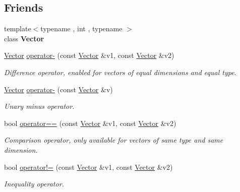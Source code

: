 \subsection*{Friends}
\begin{DoxyCompactItemize}
\item 
\hypertarget{classVector_a4f79607c18aef2105d5ec6b3259ecf32}{}\label{classVector_a4f79607c18aef2105d5ec6b3259ecf32} 
{\footnotesize template$<$typename , int , typename $>$ }\\class {\bfseries Vector}
\item 
\hypertarget{classVector_a885f29c16d9844e1629e3f4c89cf5499}{}\label{classVector_a885f29c16d9844e1629e3f4c89cf5499} 
\hyperlink{classVector}{Vector} \hyperlink{classVector_a885f29c16d9844e1629e3f4c89cf5499}{operator-\/} (const \hyperlink{classVector}{Vector} \&v1, const \hyperlink{classVector}{Vector} \&v2)
\begin{DoxyCompactList}\small\item\em Difference operator, enabled for vectors of equal dimensions and equal type. \end{DoxyCompactList}\item 
\hypertarget{classVector_ac7a74ab9b64a6ddb03e7d25895c2699d}{}\label{classVector_ac7a74ab9b64a6ddb03e7d25895c2699d} 
\hyperlink{classVector}{Vector} \hyperlink{classVector_ac7a74ab9b64a6ddb03e7d25895c2699d}{operator-\/} (const \hyperlink{classVector}{Vector} \&v)
\begin{DoxyCompactList}\small\item\em Unary minus operator. \end{DoxyCompactList}\item 
\hypertarget{classVector_a7910afb9c9dbb82f155e980c6eba1538}{}\label{classVector_a7910afb9c9dbb82f155e980c6eba1538} 
bool \hyperlink{classVector_a7910afb9c9dbb82f155e980c6eba1538}{operator==} (const \hyperlink{classVector}{Vector} \&v1, const \hyperlink{classVector}{Vector} \&v2)
\begin{DoxyCompactList}\small\item\em Comparison operator, only available for vectors of same type and same dimension. \end{DoxyCompactList}\item 
\hypertarget{classVector_af1f27f848ef4e7c750f8c49ac5fcacea}{}\label{classVector_af1f27f848ef4e7c750f8c49ac5fcacea} 
bool \hyperlink{classVector_af1f27f848ef4e7c750f8c49ac5fcacea}{operator!=} (const \hyperlink{classVector}{Vector} \&v1, const \hyperlink{classVector}{Vector} \&v2)
\begin{DoxyCompactList}\small\item\em Inequality operator. \end{DoxyCompactList}\item 

\end{DoxyCompactItemize}
